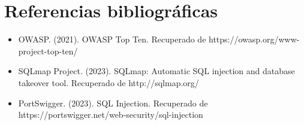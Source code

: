 \documentclass[12pt,a4paper]{article}
\begin{document}
\section{Referencias bibliográficas}
\begin{itemize}
    \item OWASP. (2021). OWASP Top Ten. Recuperado de https://owasp.org/www-project-top-ten/
    \item SQLmap Project. (2023). SQLmap: Automatic SQL injection and database takeover tool. Recuperado de http://sqlmap.org/
    \item PortSwigger. (2023). SQL Injection. Recuperado de https://portswigger.net/web-security/sql-injection
\end{itemize}
\end{document}
